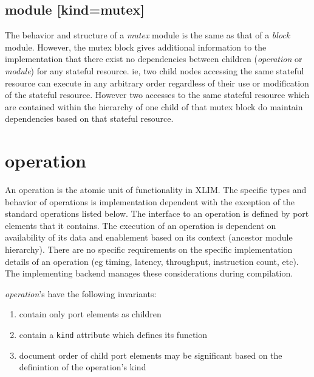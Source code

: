 \subsection{module [kind=mutex]}
The behavior and structure of a {\it mutex} module is the same as that of a {\it block} module.  However, the mutex block gives additional information to the implementation that there exist no dependencies between children ({\it operation} or {\it module}) for any stateful resource.  ie, two child nodes accessing the same stateful resource can execute in any arbitrary order regardless of their use or modification of the stateful resource.  However two accesses to the same stateful resource which are contained within the hierarchy of one child of that mutex block do maintain dependencies based on that stateful resource.

\section{operation}
An operation is the atomic unit of functionality in XLIM.  The specific types and behavior of operations is implementation dependent with the exception of the standard operations listed below.  The interface to an operation is defined by port elements that it contains.  The execution of an operation is dependent on availability of its data and enablement based on its context (ancestor module hierarchy).  There are no specific requirements on the specific implementation details of an operation (eg timing, latency, throughput, instruction count, etc).  The implementing backend manages these considerations during compilation.

{\it operation}'s have the following invariants:\\
\begin{enumerate}
\item contain only port elements as children
\item contain a {\tt kind} attribute which defines its function
\item document order of child port elements may be significant based on the definintion of the operation's kind
\end{enumerate}

